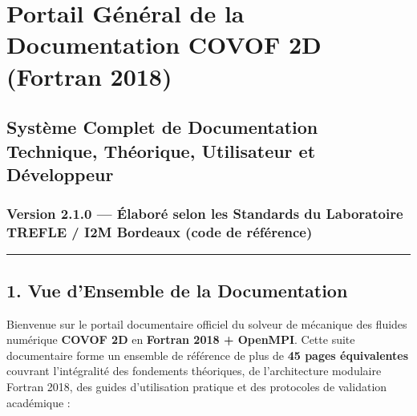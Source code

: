 \documentclass[
  french,
]{article}
\author{}
\date{}
\begin{document}
\section{Portail Général de la Documentation COVOF 2D (Fortran
2018)}\label{portail-guxe9nuxe9ral-de-la-documentation-covof-2d-fortran-2018}

\subsection{Système Complet de Documentation Technique, Théorique,
Utilisateur et
Développeur}\label{systuxe8me-complet-de-documentation-technique-thuxe9orique-utilisateur-et-duxe9veloppeur}

\subsubsection{Version 2.1.0 --- Élaboré selon les Standards du
Laboratoire TREFLE / I2M Bordeaux (code de
référence)}\label{version-2.1.0-uxe9laboruxe9-selon-les-standards-du-laboratoire-trefle-i2m-bordeaux-code-de-ruxe9fuxe9rence}

\begin{center}\rule{0.5\linewidth}{0.5pt}\end{center}

\subsection{1. Vue d'Ensemble de la
Documentation}\label{vue-densemble-de-la-documentation}

Bienvenue sur le portail documentaire officiel du solveur de mécanique
des fluides numérique \textbf{COVOF 2D} en \textbf{Fortran 2018 +
OpenMPI}. Cette suite documentaire forme un ensemble de référence de
plus de \textbf{45 pages équivalentes} couvrant l'intégralité des
fondements théoriques, de l'architecture modulaire Fortran 2018, des
guides d'utilisation pratique et des protocoles de validation académique
:
\end{document}

